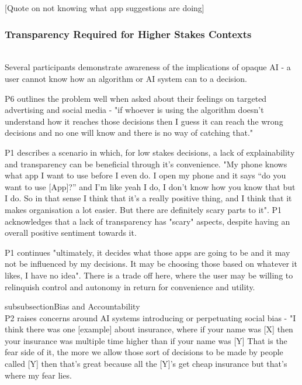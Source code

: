 \documentclass[manuscript,screen,review]{acmart}
\begin{document}
[Quote on not knowing what app suggestions are doing]



\subsubsection{Transparency Required for Higher Stakes Contexts}\hfill\\

Several participants demonstrate awareness of the implications of opaque AI - a user cannot know how an algorithm or AI system can to a decision.

P6 outlines the problem well when asked about their feelings on targeted advertising and social media - "if whoever is using the algorithm doesn’t understand how it reaches those decisions then I guess it can reach the wrong decisions and no one will know and there is no way of catching that." 

P1 describes a scenario in which, for low stakes decisions, a lack of explainability and transparency can be beneficial through it's convenience.
"My phone knows what app I want to use before I even do. I open my phone and it says “do you want to use [App]?” and I'm like yeah I do, I don’t know how you know that but I do. So in that sense I think that it’s a really positive thing, and I think that it makes organisation a lot easier. But there are definitely scary parts to it". P1 acknowledges that a lack of transparency has "scary" aspects, despite having an overall positive sentiment towards it. 

P1 continues "ultimately, it decides what those apps are going to be and it may not be influenced by my decisions. It may be choosing those based on whatever it likes, I have no idea". There is a trade off here, where the user may be willing to relinquish control and autonomy in return for convenience and utility. 



subsubsection{Bias and Accountability}\hfill\\

P2 raises concerns around AI systems introducing or perpetuating social bias - "I think there was one [example] about insurance, where if your name was [X] then your insurance was multiple time higher than if your name was [Y] That is the fear side of it, the more we allow those sort of decisions to be made by people called [Y] then that’s great because all the [Y]'s get cheap insurance but that’s where my fear lies.
\end{document}
